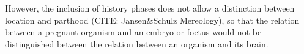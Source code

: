 
%

However, the inclusion of history phases does not allow a distinction between location and parthood (CITE: Jansen\&Schulz Mereology), so that the relation between a pregnant organism and an embryo or foetus would not be distinguished between the relation between an organism and its brain.


